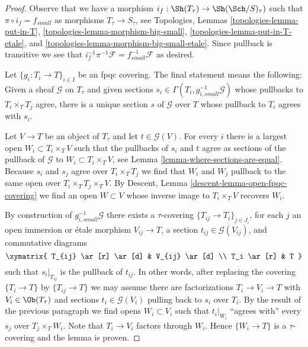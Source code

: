 \begin{proof}
Observe that we have a morphism $i_f : \Sh(T_\tau) \to \Sh(\Sch/S)_\tau)$
such that $\pi \circ i_f = f_{small}$ as morphisms
$T_\tau \to S_\tau$, see
Topologies, Lemmas \ref{topologies-lemma-put-in-T},
\ref{topologies-lemma-morphism-big-small},
\ref{topologies-lemma-put-in-T-etale}, and
\ref{topologies-lemma-morphism-big-small-etale}.
Since pullback is transitive we see that
$i_f^{-1} \pi^{-1}\mathcal{F} = f_{small}^{-1}\mathcal{F}$ as desired.

\medskip\noindent
Let $\{g_i : T_i \to T\}_{i \in I}$ be an fpqc covering.
The final statement means the following: Given a sheaf $\mathcal{G}$
on $T_\tau$ and given sections
$s_i \in \Gamma(T_i, g_{i, small}^{-1}\mathcal{G})$ whose pullbacks
to $T_i \times_T T_j$ agree, there is a unique section $s$ of $\mathcal{G}$
over $T$ whose pullback to $T_i$ agrees with $s_i$.

\medskip\noindent
Let $V \to T$ be an object of $T_\tau$ and let $t \in \mathcal{G}(V)$.
For every $i$ there is a largest open $W_i \subset T_i \times_T V$
such that the pullbacks of $s_i$ and $t$ agree as sections of the pullback
of $\mathcal{G}$ to $W_i \subset T_i \times_T V$, see
Lemma \ref{lemma-where-sections-are-equal}.
Because $s_i$ and $s_j$ agree over $T_i \times_T T_j$ we find
that $W_i$ and $W_j$ pullback to the same open over
$T_i \times_T T_j \times_T V$. By
Descent, Lemma \ref{descent-lemma-open-fpqc-covering}
we find an open $W \subset V$ whose inverse image to $T_i \times_T V$
recovers $W_i$. 

\medskip\noindent
By construction of $g_{i, small}^{-1}\mathcal{G}$ there exists
a $\tau$-covering $\{T_{ij} \to T_i\}_{j \in J_i}$, for each $j$ an
open immersion or \'etale morphism $V_{ij} \to T$, a section
$t_{ij} \in \mathcal{G}(V_{ij})$, and commutative diagrams
$$
\xymatrix{
T_{ij} \ar[r] \ar[d] & V_{ij} \ar[d] \\
T_i \ar[r] & T
}
$$
such that $s_i|_{T_{ij}}$ is the pullback of $t_{ij}$. In other words,
after replacing the covering $\{T_i \to T\}$ by $\{T_{ij} \to T\}$
we may assume there are factorizations $T_i \to V_i \to T$ with
$V_i \in \Ob(T_\tau)$ and sections $t_i \in \mathcal{G}(V_i)$
pulling back to $s_i$ over $T_i$.
By the result of the previous paragraph we find opens $W_i \subset V_i$
such that $t_i|_{W_i}$ ``agrees with'' every $s_j$ over $T_j \times_T W_i$.
Note that $T_i \to V_i$ factors through $W_i$.
Hence $\{W_i \to T\}$ is a $\tau$-covering and the lemma is proven.
\end{proof}


